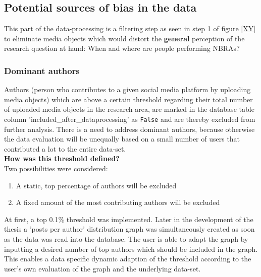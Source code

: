 \subsection{Potential sources of bias in the data} \label{sources_data_bias}
This part of the data-processing is a filtering step as seen in step 1 of figure \ref{XY} to eliminate media objects which would distort the \textbf{general} perception of the research question at hand: When and where are people performing NBRAs?

\subsubsection{Dominant authors} \label{bias_dominant_authors}
Authors (person who contributes to a given social media platform by uploading media objects) which are above a certain threshold regarding their total number of uploaded media objects in the research area, are marked in the database table column 'included\_after\_dataprocessing' as \texttt{False} and are thereby excluded from further analysis. There is a need to address dominant authors, because otherwise the data evaluation will be unequally based on a small number of users that contributed a lot to the entire data-set.\\
\newline
\textbf{How was this threshold defined?}\\
\newline
Two possibilities were considered:
\begin{enumerate}
  \item A static, top percentage of authors will be excluded
  \item A fixed amount of the most contributing authors will be excluded
\end{enumerate}

At first, a top 0.1\% threshold was implemented. Later in the development of the thesis a 'posts per author' distribution graph was simultaneously created as soon as the data was read into the database. The user is able to adapt the graph by inputting a desired number of top authors which should be included in the graph. This enables a data specific dynamic adaption of the threshold according to the user's own evaluation of the graph and the underlying data-set.

